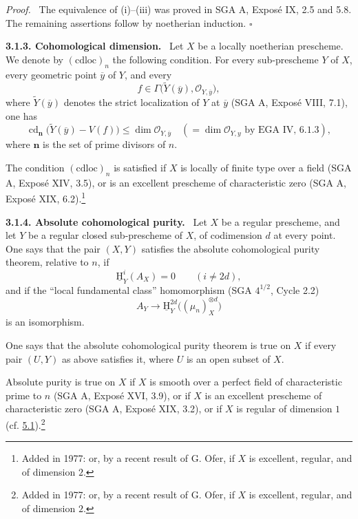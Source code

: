 \documentclass[11pt]{article}
\providecommand{\cO}{\mathcal{O}}
\providecommand{\wt}[1]{\widetilde{#1}}
\providecommand{\uH}{\underline{\mathrm H}}
\providecommand{\qedtext}{\hfill$\square$}
\newenvironment{statement}[1]{\par\medskip\noindent\textbf{#1.}\ }{\par\medskip}
\newenvironment{prooftext}[1][Proof]{\par\noindent\emph{#1.}\ }{\par\medskip}
\DeclareMathOperator{\cd}{cd}
\newcommand{\ol}[1]{\overline{#1}}
\providecommand{\qedtext}{\hfill$\square$}
\begin{document}
\begin{prooftext}
The equivalence of (i)--(iii) was proved in SGA A, Exposé IX, 2.5 and 5.8. The remaining assertions follow by noetherian induction. \qedtext
\end{prooftext}

\label{sga5:I:statement:3.1.3}\begin{statement}{3.1.3. Cohomological dimension}
Let $X$ be a locally noetherian prescheme. We denote by $(\mathrm{cdloc})_n$ the following condition. For every sub-prescheme $Y$ of $X$, every geometric point $\ol y$ of $Y$, and every
\[
   f\in\Gamma\bigl(\wt Y(\ol y),\cO_{Y,\ol y}\bigr),
\]
where $\wt Y(\ol y)$ denotes the strict localization of $Y$ at $\ol y$ (SGA A, Exposé VIII, 7.1), one has
\[
   \cd_{\mathbf n}\bigl(\wt Y(\ol y)-V(f)\bigr)
       \le \dim \cO_{Y,\ol y}
       \quad (=\dim \cO_{Y,y}\text{ by EGA IV, 6.1.3}),
\]
where $\mathbf n$ is the set of prime divisors of $n$.

The condition $(\mathrm{cdloc})_n$ is satisfied if $X$ is locally of finite type over a field (SGA A, Exposé XIV, 3.5), or is an excellent prescheme of characteristic zero (SGA A, Exposé XIX, 6.2).\footnote{Added in 1977: or, by a recent result of G. Ofer, if $X$ is excellent, regular, and of dimension $2$.}
\end{statement}

\label{sga5:I:statement:3.1.4}\begin{statement}{3.1.4. Absolute cohomological purity}
Let $X$ be a regular prescheme, and let $Y$ be a regular closed sub-prescheme of $X$, of codimension $d$ at every point. One says that the pair $(X,Y)$ satisfies the absolute cohomological purity theorem, relative to $n$, if
\[
   \uH^i_Y(A_X)=0\qquad (i\ne 2d),
\]
and if the ``local fundamental class'' homomorphism (SGA $4^{1/2}$, Cycle 2.2)
\[
   A_Y\longrightarrow \uH^{2d}_Y\bigl((\mu_n)^{\otimes d}_X\bigr)
\]
is an isomorphism.

One says that the absolute cohomological purity theorem is true on $X$ if every pair $(U,Y)$ as above satisfies it, where $U$ is an open subset of $X$.

Absolute purity is true on $X$ if $X$ is smooth over a perfect field of characteristic prime to $n$ (SGA A, Exposé XVI, 3.9), or if $X$ is an excellent prescheme of characteristic zero (SGA A, Exposé XIX, 3.2), or if $X$ is regular of dimension $1$ (cf. \hyperref[sga5:I:theorem:5.1]{5.1}).\footnote{Added in 1977: or, by a recent result of G. Ofer, if $X$ is excellent, regular, and of dimension $2$.}
\end{statement}
\end{document}
